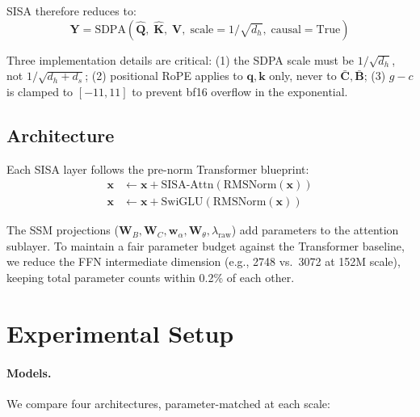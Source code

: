 \documentclass[11pt]{article}
\begin{document}
SISA therefore reduces to:
\begin{equation}
\mathbf{Y} = \text{SDPA}\!\left(\hat{\mathbf{Q}},\; \hat{\mathbf{K}},\; \mathbf{V},\; \text{scale} = 1/\sqrt{d_h},\; \text{causal} = \text{True}\right)
\end{equation}

Three implementation details are critical: (1) the SDPA scale must be $1/\sqrt{d_h}$, not $1/\sqrt{d_h + d_s}$; (2) positional RoPE applies to $\mathbf{q}, \mathbf{k}$ only, never to $\bar{\mathbf{C}}, \bar{\mathbf{B}}$; (3) $g - c$ is clamped to $[-11, 11]$ to prevent bf16 overflow in the exponential.

\subsection{Architecture}

Each SISA layer follows the pre-norm Transformer blueprint:
\begin{align*}
\mathbf{x} &\leftarrow \mathbf{x} + \text{SISA-Attn}(\text{RMSNorm}(\mathbf{x})) \\
\mathbf{x} &\leftarrow \mathbf{x} + \text{SwiGLU}(\text{RMSNorm}(\mathbf{x}))
\end{align*}

The SSM projections ($\mathbf{W}_B, \mathbf{W}_C, \mathbf{w}_\alpha, \mathbf{W}_\theta, \lambda_{\text{raw}}$) add parameters to the attention sublayer. To maintain a fair parameter budget against the Transformer baseline, we reduce the FFN intermediate dimension (e.g., 2748 vs.\ 3072 at 152M scale), keeping total parameter counts within 0.2\% of each other.

\section{Experimental Setup}

\paragraph{Models.} We compare four architectures, parameter-matched at each scale:
\end{document}
